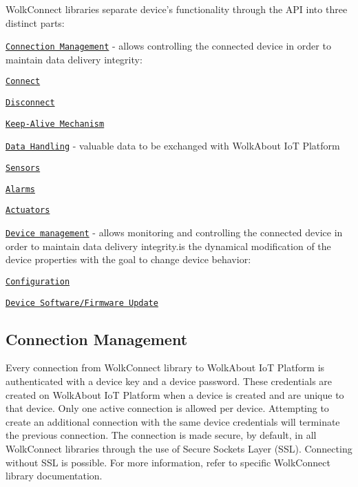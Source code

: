  Wolk\+Connect libraries separate device’s functionality through the A\+PI into three distinct parts\+:


\begin{DoxyItemize}
\item \href{#connection-management}{\tt Connection Management} -\/ allows controlling the connected device in order to maintain data delivery integrity\+:
\begin{DoxyItemize}
\item \href{#connect}{\tt Connect}
\item \href{#disconnect}{\tt Disconnect}
\item \href{#keep-alive-mechanism}{\tt Keep-\/\+Alive Mechanism}
\end{DoxyItemize}
\item \href{#data-handling}{\tt Data Handling} -\/ valuable data to be exchanged with Wolk\+About IoT Platform
\begin{DoxyItemize}
\item \href{#sensor-readings}{\tt Sensors}
\item \href{#alarms}{\tt Alarms}
\item \href{#actuators}{\tt Actuators}
\end{DoxyItemize}
\item \href{#device-managment}{\tt Device management} -\/ allows monitoring and controlling the connected device in order to maintain data delivery integrity.\+is the dynamical modification of the device properties with the goal to change device behavior\+:
\begin{DoxyItemize}
\item \href{#configuration}{\tt Configuration}
\item \href{#dfu}{\tt Device Software/\+Firmware Update} 


\end{DoxyItemize}
\end{DoxyItemize}

\label{_connection-management}%
 \subsection*{Connection Management}



 

Every connection from Wolk\+Connect library to Wolk\+About IoT Platform is authenticated with a device key and a device password. These credentials are created on Wolk\+About IoT Platform when a device is created and are unique to that device. Only one active connection is allowed per device. Attempting to create an additional connection with the same device credentials will terminate the previous connection. The connection is made secure, by default, in all Wolk\+Connect libraries through the use of Secure Sockets Layer (S\+SL). Connecting without S\+SL is possible. For more information, refer to specific Wolk\+Connect library documentation.

